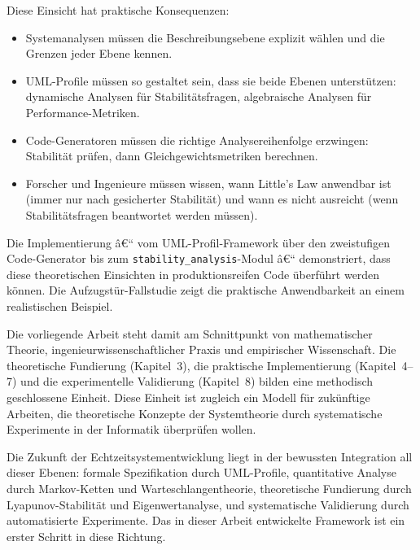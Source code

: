 ﻿\documentclass[a4paper,12pt]{report}
\theoremstyle{definition}
\begin{document}
Diese Einsicht hat praktische Konsequenzen:
\begin{itemize}
	\item[-] Systemanalysen müssen die Beschreibungsebene explizit wählen
	und die Grenzen jeder Ebene kennen.
	\item[-] UML-Profile müssen so gestaltet sein, dass sie beide Ebenen
	unterstützen: dynamische Analysen für Stabilitätsfragen,
	algebraische Analysen für Performance-Metriken.
	\item[-] Code-Generatoren müssen die richtige Analysereihenfolge
	erzwingen: Stabilität prüfen, dann Gleichgewichtsmetriken
	berechnen.
	\item[-] Forscher und Ingenieure müssen wissen, wann Little's Law
	anwendbar ist (immer nur nach gesicherter Stabilität) und
	wann es nicht ausreicht (wenn Stabilitätsfragen beantwortet
	werden müssen).
\end{itemize}

Die Implementierung â€“ vom UML-Profil-Framework über den zweistufigen
Code-Generator bis zum \texttt{stability\_analysis}-Modul â€“ demonstriert,
dass diese theoretischen Einsichten in produktionsreifen Code überführt
werden können.  Die Aufzugstür-Fallstudie zeigt die praktische
Anwendbarkeit an einem realistischen Beispiel.

Die vorliegende Arbeit steht damit am Schnittpunkt von mathematischer Theorie,
ingenieurwissenschaftlicher Praxis und empirischer Wissenschaft.  Die
theoretische Fundierung (Kapitel~3), die praktische Implementierung
(Kapitel~4--7) und die experimentelle Validierung (Kapitel~8) bilden eine
methodisch geschlossene Einheit.  Diese Einheit ist zugleich ein Modell
für zukünftige Arbeiten, die theoretische Konzepte der Systemtheorie durch
systematische Experimente in der Informatik überprüfen wollen.

Die Zukunft der Echtzeitsystementwicklung liegt in der bewussten Integration
all dieser Ebenen: formale Spezifikation durch UML-Profile, quantitative
Analyse durch Markov-Ketten und Warteschlangentheorie, theoretische Fundierung
durch Lyapunov-Stabilität und Eigenwertanalyse, und systematische Validierung
durch automatisierte Experimente.  Das in dieser Arbeit entwickelte Framework
ist ein erster Schritt in diese Richtung.

\end{document}
